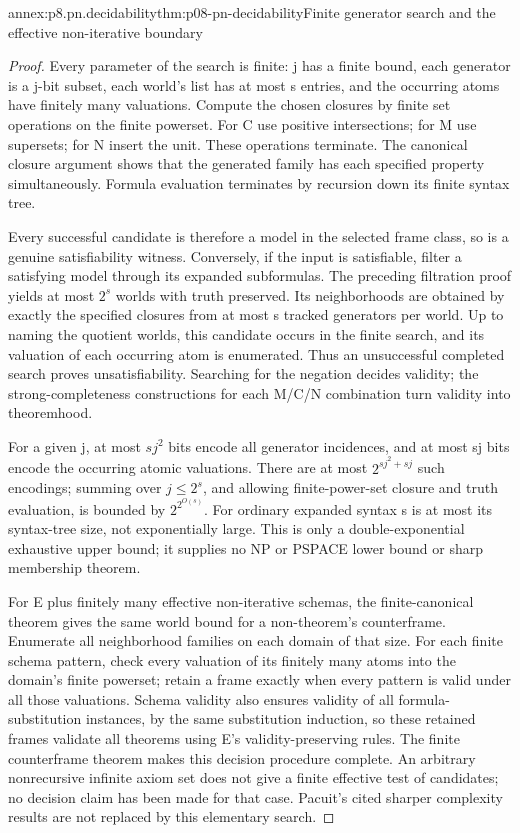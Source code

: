 \begin{annexitem}{annex:p8.pn.decidability}{thm:p08-pn-decidability}{Finite generator search and the effective non-iterative boundary}
\begin{proof}
Every parameter of the search is finite: j has a finite bound,
each generator is a j-bit subset, each world's list has at most
s entries, and the occurring atoms have finitely many valuations.
Compute the chosen closures by finite set operations on the
finite powerset. For C use positive intersections; for M use
supersets; for N insert the unit. These operations terminate.
The canonical closure argument shows that the generated family
has each specified property simultaneously. Formula evaluation
terminates by recursion down its finite syntax tree.

Every successful candidate is therefore a model in the selected
frame class, so is a genuine satisfiability witness. Conversely,
if the input is satisfiable, filter a satisfying model through
its expanded subformulas. The preceding filtration proof yields
at most \(2^s\) worlds with truth preserved. Its neighborhoods
are obtained by exactly the specified closures from at most s
tracked generators per world. Up to naming the quotient worlds,
this candidate occurs in the finite search, and its valuation
of each occurring atom is enumerated. Thus an unsuccessful
completed search proves unsatisfiability. Searching for the
negation decides validity; the strong-completeness constructions
for each M/C/N combination turn validity into theoremhood.

For a given j, at most \(sj^2\) bits encode all generator
incidences, and at most sj bits encode the occurring atomic
valuations. There are at most \(2^{sj^2+sj}\) such encodings;
summing over \(j\leq2^s\), and allowing finite-power-set
closure and truth evaluation, is bounded by
\(2^{2^{O(s)}}\). For ordinary expanded syntax s is at most
its syntax-tree size, not exponentially large. This is only
a double-exponential exhaustive upper bound; it supplies no
NP or PSPACE lower bound or sharp membership theorem.

For E plus finitely many effective non-iterative schemas, the
finite-canonical theorem gives the same world bound for a
non-theorem's counterframe. Enumerate all neighborhood families
on each domain of that size. For each finite schema pattern,
check every valuation of its finitely many atoms into the
domain's finite powerset; retain a frame exactly when every
pattern is valid under all those valuations. Schema validity
also ensures validity of all formula-substitution instances,
by the same substitution induction, so these retained frames
validate all theorems using E's validity-preserving rules.
The finite counterframe theorem makes this decision procedure
complete. An arbitrary nonrecursive infinite axiom set does
not give a finite effective test of candidates; no decision
claim has been made for that case. Pacuit's cited sharper
complexity results are not replaced by this elementary search.
\end{proof}
\end{annexitem}

